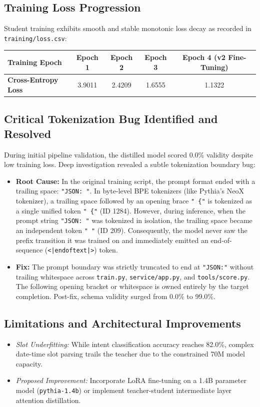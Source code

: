\documentclass[10pt,a4paper]{article}
\begin{document}
\subsection{Training Loss Progression}
Student training exhibits smooth and stable monotonic loss decay as recorded in \texttt{training/loss.csv}:
\begin{center}
\small
\begin{tabular}{lcccc}
\toprule
\textbf{Training Epoch} & \textbf{Epoch 1} & \textbf{Epoch 2} & \textbf{Epoch 3} & \textbf{Epoch 4 (v2 Fine-Tuning)} \\
\midrule
\textbf{Cross-Entropy Loss} & 3.9011 & 2.4209 & 1.6555 & 1.1322 \\
\bottomrule
\end{tabular}
\end{center}

\subsection{Critical Tokenization Bug Identified and Resolved}
During initial pipeline validation, the distilled model scored 0.0\% validity despite low training loss. Deep investigation revealed a subtle tokenization boundary bug:
\begin{itemize}[noitemsep,topsep=2pt,leftmargin=*]
    \item \textbf{Root Cause:} In the original training script, the prompt format ended with a trailing space: \texttt{"JSON: "}. In byte-level BPE tokenizers (like Pythia's NeoX tokenizer), a trailing space followed by an opening brace \texttt{" \{"} is tokenized as a single unified token \texttt{" \{"} (ID 1284). However, during inference, when the prompt string \texttt{"JSON: "} was tokenized in isolation, the trailing space became an independent token \texttt{" "} (ID 209). Consequently, the model never saw the prefix transition it was trained on and immediately emitted an end-of-sequence (\texttt{<|endoftext|>}) token.
    \item \textbf{Fix:} The prompt boundary was strictly truncated to end at \texttt{"JSON:"} without trailing whitespace across \texttt{train.py}, \texttt{service/app.py}, and \texttt{tools/score.py}. The following opening bracket or whitespace is owned entirely by the target completion. Post-fix, schema validity surged from 0.0\% to 99.0\%.
\end{itemize}

\subsection{Limitations and Architectural Improvements}
\begin{itemize}[noitemsep,topsep=2pt,leftmargin=*]
    \item \textit{Slot Underfitting:} While intent classification accuracy reaches 82.0\%, complex date-time slot parsing trails the teacher due to the constrained 70M model capacity.
    \item \textit{Proposed Improvement:} Incorporate LoRA fine-tuning on a 1.4B parameter model (\texttt{pythia-1.4b}) or implement teacher-student intermediate layer attention distillation.
\end{itemize}
\end{document}
